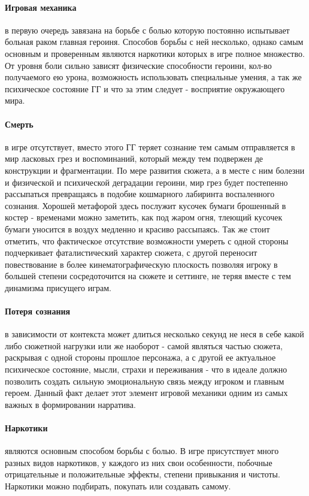 \documentclass[11pt]{report}
\begin{document}
\paragraph{Игровая механика} в первую очередь завязана на борьбе с болью которую постоянно испытывает больная раком главная героиня. Способов борьбы с ней несколько, однако самым основным и проверенным являются наркотики которых в игре полное множество. От уровня боли сильно зависят физические способности героини, кол-во получаемого ею урона, возможность использовать специальные умения, а так же психическое состояние ГГ и что за этим следует - восприятие окружающего мира.
\paragraph{Смерть} в игре отсутствует, вместо этого ГГ теряет сознание тем самым отправляется в мир ласковых грез и воспоминаний, который между тем подвержен де конструкции и фрагментации. По мере развития сюжета, а в месте с ним болезни и физической и психической деградации героини, мир грез будет постепенно рассыпаться превращаясь в подобие кошмарного лабиринта воспаленного сознания. Хорошей метафорой здесь послужит кусочек бумаги брошенный в костер - временами можно заметить, как под жаром огня, тлеющий кусочек бумаги уносится в воздух медленно и красиво рассыпаясь. Так же стоит отметить, что фактическое отсутствие возможности умереть с одной стороны подчеркивает фаталистический характер сюжета, с другой переносит повествование в более кинематографическую плоскость позволяя игроку в большей степени сосредоточится на сюжете и сеттинге, не теряя вместе с тем динамизма присущего играм.
\paragraph{Потеря сознания} в зависимости от контекста может длиться несколько секунд не неся в себе какой либо сюжетной нагрузки или же наоборот - самой являться частью сюжета, раскрывая с одной стороны прошлое персонажа, а с другой ее актуальное психическое состояние, мысли, страхи и переживания - что в идеале должно позволить создать сильную эмоциональную связь между игроком и главным героем. Данный факт делает этот элемент игровой механики одним из самых важных в формировании нарратива.
\paragraph{Наркотики} являются основным способом борьбы с болью. В игре присутствует много разных видов наркотиков, у каждого из них свои особенности, побочные отрицательные и положительные эффекты, степени привыкания и чистоты. Наркотики можно подбирать, покупать или создавать самому.
\end{document}
